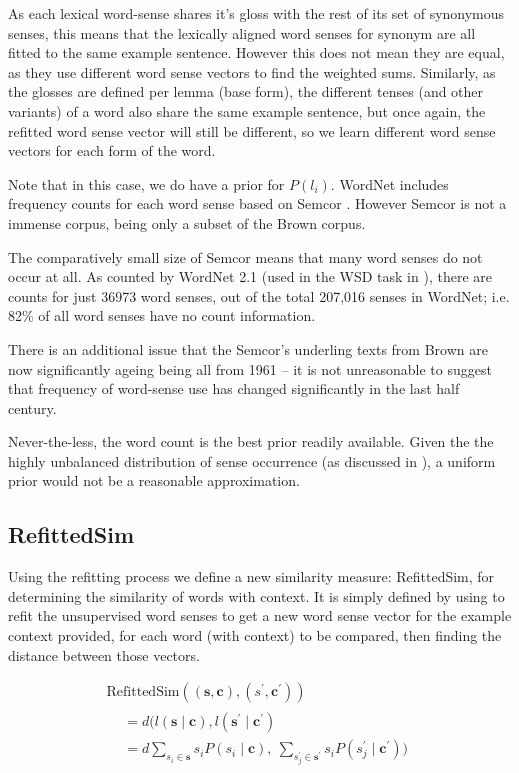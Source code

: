 \documentclass{sig-alternate}
\renewcommand{\c}{\mathbf{c}}
\newcommand{\s}{\mathbf{s}}
\begin{document}
As each lexical word-sense shares it's gloss with the rest of its set of synonymous senses, this means that the lexically aligned word senses for synonym are all fitted to the same example sentence. However this does not mean they are equal, as they use different word sense vectors to find the weighted sums. Similarly, as the glosses are defined per lemma (base form), the different tenses (and other variants) of a word also share the same example sentence, but once again, the refitted word sense vector will still be different, so we learn different word sense vectors for each form of the word.



Note that in this case, we do have a prior for $P(l_i)$.
WordNet includes frequency counts for each word sense based on Semcor \textcite{tengi1998design}.
However Semcor is not a immense corpus, being only a subset of the Brown corpus.

The comparatively small size of Semcor means that many word senses do not occur at all. As counted by WordNet 2.1 (used in the WSD task in ), there are counts for just  36973 word senses, out of the total 207,016 senses in WordNet; i.e. 82\% of all word senses have no count information.

There is an additional issue that the Semcor's underling texts from Brown are now significantly ageing being all from 1961 \cite{francis1979brown} -- it is not unreasonable to suggest that frequency of word-sense use has changed significantly in the last half century.

Never-the-less, the word count is the best prior readily available. Given the the highly unbalanced distribution of sense occurrence (as discussed in ),
a uniform prior would not be a reasonable approximation.


\subsection{RefittedSim}\label{RefittedSimVsAvgSimC}

Using the refitting process we define a new similarity measure: RefittedSim, for determining the similarity of words with context.
It is simply defined by using  to refit the unsupervised word senses to get a new word sense vector for the example context provided, for each word (with context) to be compared, then finding the distance between those vectors.

\begin{multline} \label{eq:refittedsim}
\mathrm{RefittedSim}((\s,\c),(s^{\prime},\c^{\prime}))\\
\begin{aligned}
&= d(l(\s \mid \c), l(\s^\prime \mid \c^\prime)\\
&= d
\sum_{s_{i}\in\s}s_{i}P(s_{i}\mid\c),\:
\sum_{s_{j}^{\prime}\in\s^{\prime}}s_{i}P(s_{j}^{\prime}\mid\c^{\prime}))
\end{aligned}
\end{multline}
\end{document}
